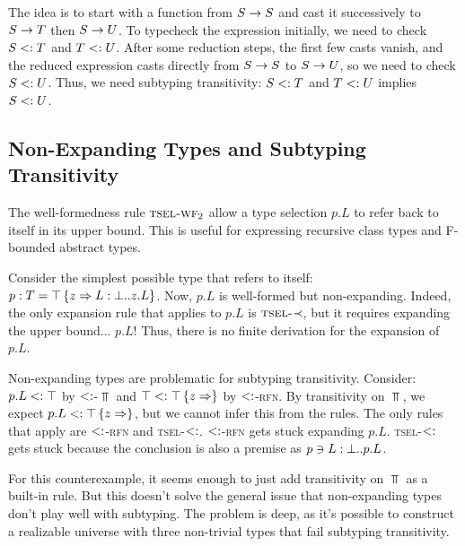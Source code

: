 \documentclass[preprint]{sigplanconf}
\begin{document}
The idea is to start with a function from $S \rightarrow S$ and cast it
successively to $S \rightarrow T$ then $S \rightarrow U$. To typecheck the
expression initially, we need to check $S <: T$ and $T <:
U$. After some reduction steps, the first few casts vanish, and the
reduced expression casts directly from $S \rightarrow S$ to $S \rightarrow U$, so
we need to check $S <: U$. Thus, we need subtyping transitivity: $S
<: T$ and $T <: U$ implies $S <: U$.

\subsection{Non-Expanding Types and Subtyping Transitivity}\label{nonexp}

The well-formedness rule $\textsc{tsel-wf$_2$}$ allow a type selection
$p.L$ to refer back to itself in its upper bound. This is useful for
expressing recursive class types and F-bounded abstract types.

Consider the simplest possible type that refers to itself: $p : T =
\top \left\{z \Rightarrow L : \bot..z.L \right\}$. Now, $p.L$ is well-formed but
non-expanding. Indeed, the only expansion rule that applies to $p.L$
is $\textsc{tsel-$\prec$}$, but it requires expanding the upper
bound... $p.L$! Thus, there is no finite derivation for the expansion
of $p.L$.

Non-expanding types are problematic for subtyping
transitivity. Consider: $p.L <: \top$ by \textsc{$<:$-$\Top$} and
$\top <: \top \left\{z \Rightarrow  \right\}$ by \textsc{$<:$-rfn}. By transitivity
on $\Top$, we expect $p.L <: \top \left\{z \Rightarrow  \right\}$, but we cannot infer
this from the rules. The only rules that apply are \textsc{$<:$-rfn}
and \textsc{tsel-$<:$}. \textsc{$<:$-rfn} gets stuck expanding
$p.L$. \textsc{tsel-$<:$} gets stuck because the conclusion is also
a premise as $p \ni L : \bot..p.L$.

For this counterexample, it seems enough to just add transitivity on
$\Top$ as a built-in rule. But this doesn't solve the general issue
that non-expanding types don't play well with subtyping. The problem
is deep, as it's possible to construct a realizable universe with
three non-trivial types that fail subtyping transitivity.
\end{document}
